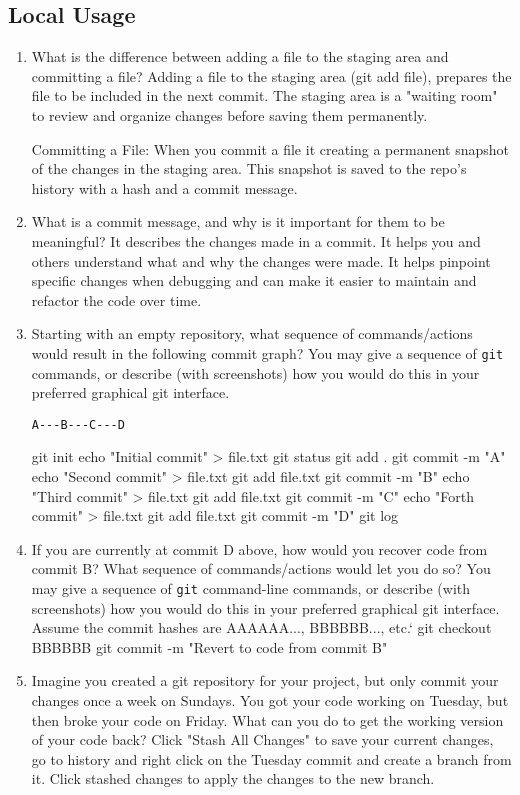 \documentclass[10pt,twocolumn]{article}
\begin{document}
\subsection{Local Usage}

\begin{enumerate}
\item What is the difference between adding a file to the staging area and committing a file?
\newline
\newline Adding a file to the staging area (git add file), prepares the file to be included in the next commit. The staging area is a "waiting room"  to review and organize changes before saving them permanently.

Committing a File: When you commit a file it creating a permanent snapshot of the changes in the staging area. This snapshot is saved to the repo's history with a hash and a commit message.

\item What is a commit message, and why is it important for them to be meaningful?
\newline
\newline It describes the changes made in a commit. It helps you and others understand what and why the changes were made. It helps pinpoint specific changes when debugging and can make it easier to maintain and refactor the code over time. 

\item Starting with an empty repository, what sequence of commands/actions would result in the following commit graph? You may give a sequence of \texttt{git} commands, or describe (with screenshots) how you would do this in your preferred graphical git interface.
\begin{verbatim}
A---B---C---D
\end{verbatim}
git init
echo "Initial commit" > file.txt
git status
git add .
git commit -m "A"
echo "Second commit" > file.txt
git add file.txt
git commit -m "B"
echo "Third commit" > file.txt
git add file.txt
git commit -m "C"
echo "Forth commit" > file.txt
git add file.txt
git commit -m "D"
git log

\item If you are currently at commit D above, how would you recover code from commit B? What sequence of commands/actions would let you do so? You may give a sequence of \texttt{git} command-line commands, or describe (with screenshots) how you would do this in your preferred graphical git interface. Assume the commit hashes are AAAAAA..., BBBBBB..., etc.`
git checkout BBBBBB
git commit -m "Revert to code from commit B"


\item Imagine you created a git repository for your project, but only commit your changes once a week on Sundays. You got your code working on Tuesday, but then broke your code on Friday. What can you do to get the working version of your code back?
Click "Stash All Changes" to save your current changes, go to history and right click on the Tuesday commit and create a branch from it. Click stashed changes to apply the changes to the new branch. 
\end{enumerate}
\end{document}
